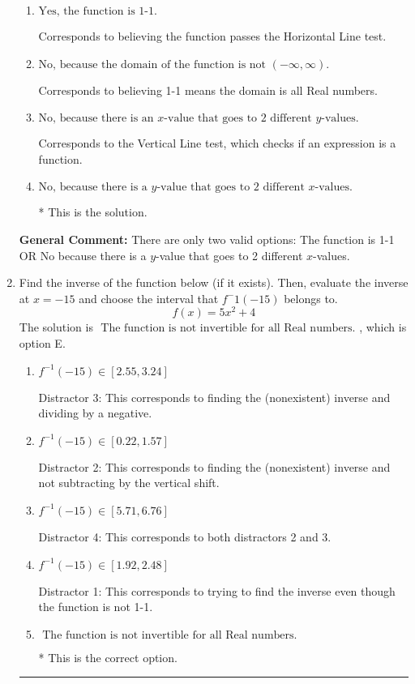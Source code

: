 \documentclass{extbook}[14pt]
\newcommand{\litem}[1]{\item #1

\rule{\textwidth}{0.4pt}}
\begin{document}
\begin{enumerate}
{\begin{enumerate}[label=\Alph*.]
Corresponds to believing 1-1 means the range is all Real numbers.
\item \( \text{Yes, the function is 1-1.} \)

Corresponds to believing the function passes the Horizontal Line test.
\item \( \text{No, because the domain of the function is not $(-\infty, \infty)$.} \)

Corresponds to believing 1-1 means the domain is all Real numbers.
\item \( \text{No, because there is an $x$-value that goes to 2 different $y$-values.} \)

Corresponds to the Vertical Line test, which checks if an expression is a function.
\item \( \text{No, because there is a $y$-value that goes to 2 different $x$-values.} \)

* This is the solution.
\end{enumerate}

\textbf{General Comment:} There are only two valid options: The function is 1-1 OR No because there is a $y$-value that goes to 2 different $x$-values.
}
\litem{
Find the inverse of the function below (if it exists). Then, evaluate the inverse at $x = -15$ and choose the interval that $f^-1(-15)$ belongs to.
\[ f(x) = 5 x^2 + 4 \]The solution is \( \text{ The function is not invertible for all Real numbers. } \), which is option E.\begin{enumerate}[label=\Alph*.]
\item \( f^{-1}(-15) \in [2.55, 3.24] \)

 Distractor 3: This corresponds to finding the (nonexistent) inverse and dividing by a negative.
\item \( f^{-1}(-15) \in [0.22, 1.57] \)

 Distractor 2: This corresponds to finding the (nonexistent) inverse and not subtracting by the vertical shift.
\item \( f^{-1}(-15) \in [5.71, 6.76] \)

 Distractor 4: This corresponds to both distractors 2 and 3.
\item \( f^{-1}(-15) \in [1.92, 2.48] \)

 Distractor 1: This corresponds to trying to find the inverse even though the function is not 1-1. 
\item \( \text{ The function is not invertible for all Real numbers. } \)

* This is the correct option.
\end{enumerate}

}
\end{enumerate}
\end{document}
